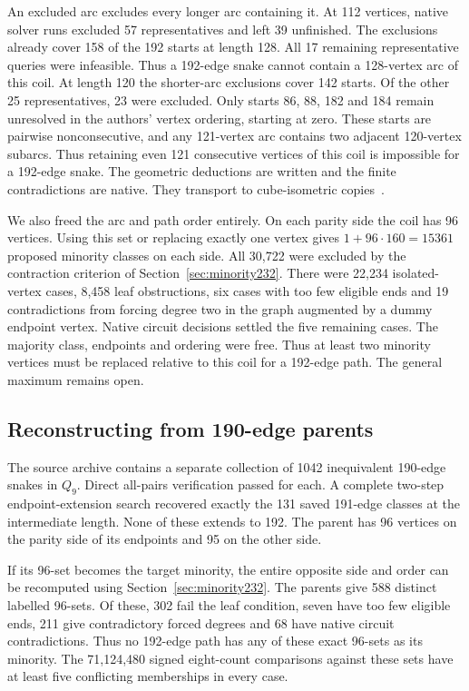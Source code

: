 \documentclass[11pt,a4paper]{article}
\theoremstyle{definition}
\theoremstyle{remark}
\begin{document}
An excluded arc excludes every longer arc containing it. At 112
vertices, native solver runs excluded 57 representatives and left 39
unfinished. The exclusions already cover 158 of the 192 starts at
length 128. All 17 remaining representative queries were infeasible.
Thus a 192-edge snake cannot contain a 128-vertex arc of this coil.
At length 120 the shorter-arc exclusions cover 142 starts. Of the
other 25 representatives, 23 were excluded. Only starts 86, 88, 182
and 184 remain unresolved in the authors' vertex ordering, starting at
zero. These starts are pairwise nonconsecutive, and any 121-vertex arc
contains two adjacent 120-vertex subarcs. Thus retaining even 121
consecutive vertices of this coil is impossible for a 192-edge snake.
The geometric deductions are written and the finite contradictions are
native. They transport to cube-isometric copies~\cite{coilopening243}.

We also freed the arc and path order entirely. On each parity side
the coil has 96 vertices. Using this set or replacing exactly one
vertex gives $1+96\cdot160=15361$ proposed minority classes on each
side. All 30,722 were excluded by the contraction criterion of
Section~\ref{sec:minority232}. There were 22,234 isolated-vertex
cases, 8,458 leaf obstructions, six cases with too few eligible ends
and 19 contradictions from forcing degree two in the graph augmented
by a dummy endpoint vertex. Native circuit decisions settled the five
remaining cases. The majority class, endpoints and ordering were free.
Thus at least two minority vertices must be replaced relative to this
coil for a 192-edge path. The general maximum remains open.

\subsection{Reconstructing from 190-edge parents}\label{sec:parents244}
The source archive contains a separate collection of 1042 inequivalent
190-edge snakes in $Q_9$. Direct all-pairs verification passed for
each. A complete two-step endpoint-extension search recovered exactly
the 131 saved 191-edge classes at the intermediate length. None of
these extends to 192. The parent has 96 vertices on the parity side
of its endpoints and 95 on the other side.

If its 96-set becomes the target minority, the entire opposite side
and order can be recomputed using Section~\ref{sec:minority232}. The
parents give 588 distinct labelled 96-sets. Of these, 302 fail the
leaf condition, seven have too few eligible ends, 211 give
contradictory forced degrees and 68 have native circuit contradictions.
Thus no 192-edge path has any of these exact 96-sets as its minority.
The 71,124,480 signed eight-count comparisons against these sets
have at least five conflicting memberships in every case.
\end{document}
